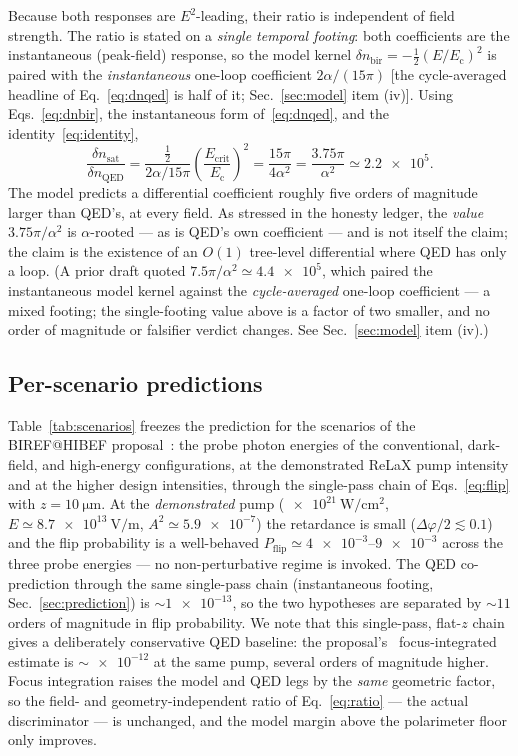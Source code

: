 \documentclass[aps,prd,twocolumn,superscriptaddress,nofootinbib,longbibliography]{revtex4-2}
\newcommand{\Ec}{E_{\mathrm{c}}}
\newcommand{\Ecrit}{E_{\mathrm{crit}}}
\newcommand{\dnbir}{\delta n_{\mathrm{bir}}}
\newcommand{\dnsat}{\delta n_{\mathrm{sat}}}
\newcommand{\Pflip}{P_{\mathrm{flip}}}
\begin{document}
Because both responses are $E^2$-leading, their ratio is independent of field
strength. The ratio is stated on a \emph{single temporal footing}: both
coefficients are the instantaneous (peak-field) response, so the model kernel
$\dnbir=-\tfrac12(E/\Ec)^2$ is paired with the \emph{instantaneous} one-loop
coefficient $2\alpha/(15\pi)$ [the cycle-averaged headline of
Eq.~\eqref{eq:dnqed} is half of it; Sec.~\ref{sec:model} item (iv)]. Using
Eqs.~\eqref{eq:dnbir}, the instantaneous form of~\eqref{eq:dnqed}, and the
identity~\eqref{eq:identity},
%
\begin{equation}
  \frac{\dnsat}{\delta n_{\mathrm{QED}}}
  =\frac{\tfrac12}{2\alpha/15\pi}\left(\frac{\Ecrit}{\Ec}\right)^2
  =\frac{15\pi}{4\alpha^2}=\frac{3.75\pi}{\alpha^2}\simeq\num{2.2e5}.
  \label{eq:ratio}
\end{equation}
%
The model predicts a differential coefficient roughly five orders of
magnitude larger than QED's, at every field. As stressed in the honesty ledger,
the \emph{value} $3.75\pi/\alpha^2$ is $\alpha$-rooted --- as is QED's own
coefficient --- and is not itself the claim; the claim is the existence of an
$O(1)$ tree-level differential where QED has only a loop. (A prior draft quoted
$7.5\pi/\alpha^2\simeq\num{4.4e5}$, which paired the instantaneous model kernel
against the \emph{cycle-averaged} one-loop coefficient --- a mixed footing; the
single-footing value above is a factor of two smaller, and no order of magnitude
or falsifier verdict changes. See Sec.~\ref{sec:model} item (iv).)

\subsection{Per-scenario predictions}

Table~\ref{tab:scenarios} freezes the prediction for the scenarios of the
BIREF@HIBEF proposal~\cite{BirefHibefLoI2025}: the probe photon energies of the
conventional, dark-field, and high-energy configurations, at the demonstrated
ReLaX pump intensity and at the higher design intensities, through the
single-pass chain of Eqs.~\eqref{eq:flip} with $z=\SI{10}{\micro\meter}$. At the
\emph{demonstrated} pump ($\SI{e21}{\watt\per\centi\meter\squared}$,
$E\simeq\SI{8.7e13}{\volt\per\meter}$, $A^2\simeq\num{5.9e-7}$) the retardance is
small ($\Delta\varphi/2\lesssim0.1$) and the flip probability is a well-behaved
$\Pflip\simeq\numrange{4e-3}{9e-3}$ across the three probe energies --- no
non-perturbative regime is invoked. The QED co-prediction through the same
single-pass chain (instantaneous footing, Sec.~\ref{sec:prediction}) is
$\sim\!\num{1e-13}$, so the two hypotheses are separated by
$\sim\!11$ orders of magnitude in flip probability. We note that this single-pass,
flat-$z$ chain gives a deliberately conservative QED baseline: the
proposal's~\cite{BirefHibefLoI2025} focus-integrated estimate is $\sim\!\num{e-12}$
at the same pump, several orders of magnitude higher. Focus integration raises the
model and QED legs by the \emph{same} geometric factor, so the field- and
geometry-independent ratio of Eq.~\eqref{eq:ratio} --- the actual discriminator ---
is unchanged, and the model margin above the polarimeter floor only improves.
\end{document}
